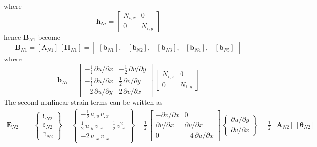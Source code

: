 where 
\begin{equation}
\mathbf{h}_{Ni} = \begin{bmatrix}
N_{i,x} &  0  \\
0 & N_{i,y}  \end{bmatrix} 
\end{equation}
hence $\mathbf{B}_{N1}$ become
\begin{equation}
\mathbf{B}_{N1} = [\mathbf{A}_{N1}] \, [\mathbf{H}_{N1}] = \begin{bmatrix}
[\mathbf{b}_{N1}], & [\mathbf{b}_{N2}], & [\mathbf{b}_{N3}], & [\mathbf{b}_{N4}], & [\mathbf{b}_{N5}] 
\end{bmatrix} 
\end{equation}
where
\begin{equation}
\mathbf{b}_{Ni} = \begin{bmatrix}
-\tfrac{1}{2} \, \partial u / \partial x &  - \tfrac{1}{2} \, \partial v / \partial y \\
-\tfrac{1}{2} \, \partial u / \partial x &  \tfrac{1}{2} \, \partial v / \partial y \\
-2 \, \partial u / \partial y  & 2 \, \partial v / \partial x  \end{bmatrix}  \, \begin{bmatrix}
N_{i,x} &  0  \\
0 & N_{i,y}  \end{bmatrix} 
\end{equation}
The second nonlinear strain terms can be written as 
\begin{equation}
\begin{aligned}
\mathbf{E}_{N2} & =  \begin{Bmatrix}
\mathrm \xi_{N2} \\
\mathrm \varepsilon_{N2} \\
\mathrm \gamma_{N2} \end{Bmatrix} =
\begin{Bmatrix}
-\tfrac{1}{2} \, u_{,y} \, v_{,x}  \\
\tfrac{1}{2} \, u_{,y} \, v_{,x}  + \tfrac{1}{2} \, v_{,x}^2 \\
-2 \, u_{,x} \, v_{,x} \end{Bmatrix} = \frac{1}{2} \, \begin{bmatrix}
- \partial v / \partial x &  0 \\
\partial v / \partial x &  \partial v / \partial x \\
0 & -4 \, \partial u / \partial x  \end{bmatrix} \, \begin{Bmatrix}
\partial u / \partial y\\
\partial v / \partial x
\end{Bmatrix}
= \tfrac{1}{2} \, [\mathbf{A}_{N2}] \, [\boldsymbol{\theta}_{N2}]
\end{aligned}
\end{equation}
